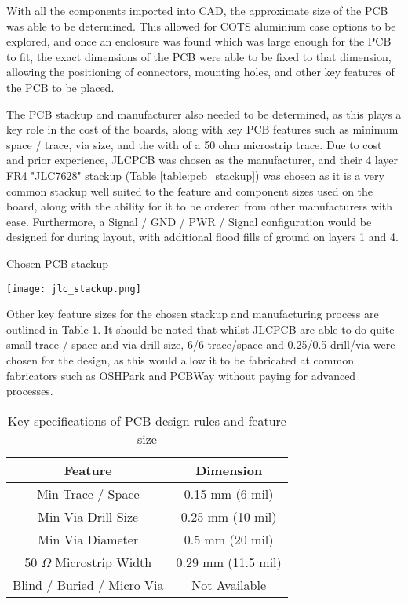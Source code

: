 With all the components imported into CAD, the approximate size of the PCB was able to be determined. This allowed for COTS aluminium case options to be explored, and once an enclosure was found which was large enough for the PCB to fit, the exact dimensions of the PCB were able to be fixed to that dimension, allowing the positioning of connectors, mounting holes, and other key features of the PCB to be placed. 

The PCB stackup and manufacturer also needed to be determined, as this plays a key role in the cost of the boards, along with key PCB features such as minimum space / trace, via size, and the with of a 50 ohm microstrip trace. Due to cost and prior experience, JLCPCB was chosen as the manufacturer, and their 4 layer FR4 "JLC7628" stackup (Table \ref{table:pcb_stackup}) was chosen as it is a very common stackup well suited to the feature and component sizes used on the board, along with the ability for it to be ordered from other manufacturers with ease. Furthermore, a Signal / GND / PWR / Signal configuration would be designed for during layout, with additional flood fills of ground on layers 1 and 4. 

\begin{table}[H]
	\centering
	\caption{Chosen PCB stackup}
	\texttt{[image: jlc\_stackup.png]}
	\label{table:pcb_stackup}
\end{table}

Other key feature sizes for the chosen stackup and manufacturing process are outlined in Table \ref{table:pcb_specs}. It should be noted that whilst JLCPCB are able to do quite small trace / space and via drill size, 6/6 trace/space and 0.25/0.5 drill/via were chosen for the design, as this would allow it to be fabricated at common fabricators such as OSHPark and PCBWay without paying for advanced processes. 
\begin{table}[H]
	\caption{Key specifications of PCB design rules and feature size}
	\label{table:pcb_specs}
	\centering
	\begin{tabular}{|c|c|}
		\hline
		\textbf{Feature}                          & \textbf{Dimension} \\ \hline
		Min Trace / Space                         & 0.15 mm (6 mil)   \\ \hline
		Min Via Drill Size                        & 0.25 mm (10 mil)     \\ \hline
		Min Via Diameter                          & 0.5 mm (20 mil)   \\ \hline
		50 $\Omega$ Microstrip Width              & 0.29 mm (11.5 mil) \\ \hline
		Blind / Buried / Micro Via                & Not Available \\ \hline
	\end{tabular}
\end{table} 

